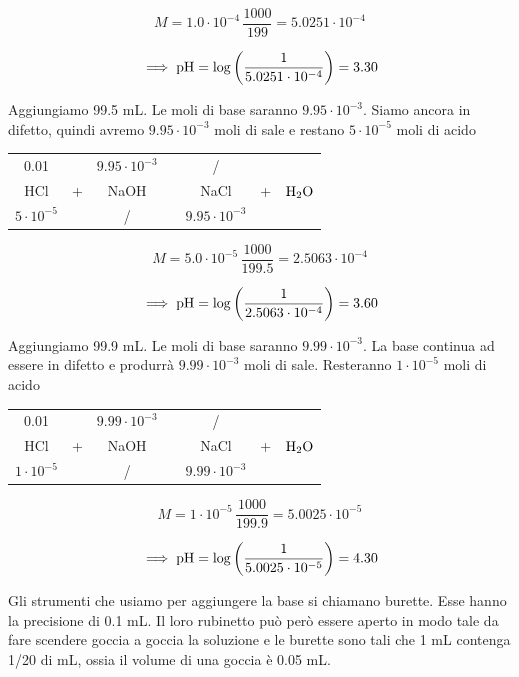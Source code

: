 $$M=1.0 \cdot 10^{-4} \, \frac{1000}{199}=5.0251\cdot 10^{-4}$$

$$\implies \rm pH=\log \left( \frac{1}{5.0251\cdot 10^{-4}} \right)=3.30$$

Aggiungiamo 99.5 mL. Le moli di base saranno $9.95 \cdot 10^{-3}$. Siamo ancora in difetto, quindi avremo $9.95 \cdot 10^{-3}$ moli di sale e restano $5 \cdot 10^{-5}$ moli di acido

\begin{center}
    \begin{tabular}{ccccccc}
        0.01 &  & $9.95 \cdot 10^{-3}$  & & / & &\\
        HCl & + & NaOH & \ce{->} & NaCl & + & $\rm H_2O$\\
        $5 \cdot 10^{-5}$ &  &  / & & $9.95 \cdot 10^{-3}$ & &\\
    \end{tabular}
\end{center}

$$M=5.0 \cdot 10^{-5} \, \frac{1000}{199.5}=2.5063 \cdot 10^{-4}$$

$$\implies \rm pH=\log \left( \frac{1}{2.5063 \cdot 10^{-4}} \right)=3.60$$

Aggiungiamo 99.9 mL. Le moli di base saranno $9.99 \cdot 10^{-3}$. La base continua ad essere in difetto e produrrà $9.99 \cdot 10^{-3}$ moli di sale. Resteranno $1 \cdot 10^{-5}$ moli di acido

\begin{center}
    \begin{tabular}{ccccccc}
        0.01 &  & $9.99 \cdot 10^{-3}$  & & / & &\\
        HCl & + & NaOH & \ce{->} & NaCl & + & $\rm H_2O$\\
        $1 \cdot 10^{-5}$ &  &  / & & $9.99 \cdot 10^{-3}$ & &\\
    \end{tabular}
\end{center}

$$M=1 \cdot 10^{-5} \, \frac{1000}{199.9}=5.0025 \cdot 10^{-5}$$

$$\implies \rm pH=\log \left( \frac{1}{5.0025 \cdot 10^{-5}} \right)=4.30$$

Gli strumenti che usiamo per aggiungere la base si chiamano burette. Esse hanno la precisione di 0.1 mL. Il loro rubinetto può però essere aperto in modo tale da fare scendere goccia a goccia la soluzione e le burette sono tali che 1 mL contenga 1/20 di mL, ossia il volume di una goccia è 0.05 mL.

